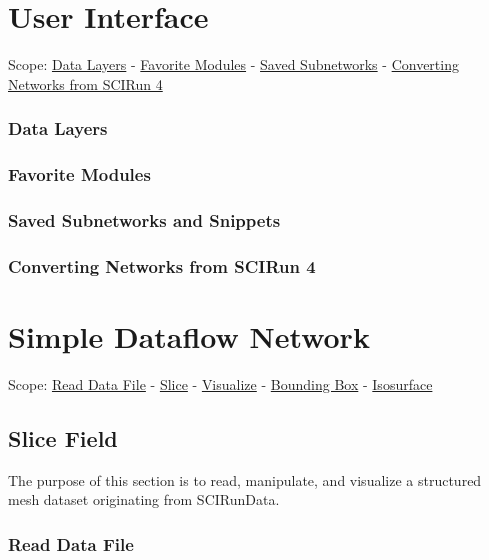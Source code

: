 \documentclass[fleqn,11pt,openany]{book}
\begin{document}
\chapter{User Interface}

\begin{introduction}
Scope: \hyperref[datalayer]{Data Layers} - \hyperref[favorites]{Favorite Modules} -
\hyperref[visualize]{Saved Subnetworks} - \hyperref[convert4]{Converting Networks from SCIRun 4} 
\end{introduction}

\subsection{Data Layers}\label{datalayer}

\subsection{Favorite Modules}\label{favorites}

\subsection{Saved Subnetworks and Snippets}\label{subnets}

\subsection{Converting Networks from SCIRun 4}\label{convert4}




\chapter{Simple Dataflow Network}

\begin{introduction}
Scope: \hyperref[readdata]{Read Data File} - \hyperref[slice]{Slice} -
\hyperref[visualize]{Visualize} - \hyperref[bbox]{Bounding Box} - \hyperref[isosurface]{Isosurface}
\end{introduction}

\section{Slice Field}

The purpose of this section is to read, manipulate, and visualize a structured mesh dataset originating from SCIRunData. 

\subsection{Read Data File}\label{readdata}
\end{document}

